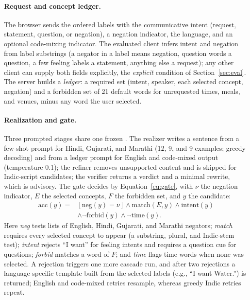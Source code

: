 \paragraph{Request and concept ledger.}
The browser sends the ordered labels with the communicative intent (request, statement, question, or negation), a negation indicator, the language, and an optional code-mixing indicator.
The evaluated client infers intent and negation from label substrings (a negator in a label means negation, question words a question, a few feeling labels a statement, anything else a request); any other client can supply both fields explicitly, the \emph{explicit} condition of Section~\ref{sec:eval}.
The server builds a \emph{ledger}: a required set (intent, speaker, each selected concept, negation) and a forbidden set of 21 default words for unrequested times, meals, and venues, minus any word the user selected.

\paragraph{Realization and gate.}
Three prompted stages share one frozen \qwen{} \citep{qwen2025qwen25}.
The realizer writes a sentence from a few-shot prompt for Hindi, Gujarati, and Marathi (12, 9, and 9 examples; greedy decoding) and from a ledger prompt for English and code-mixed output (temperature 0.1); the refiner removes unsupported content and is skipped for Indic-script candidates; the verifier returns a verdict and a minimal rewrite, which is advisory.
The gate decides by Equation~\eqref{eq:gate}, with $\nu$ the negation indicator, $E$ the selected concepts, $F$ the forbidden set, and $y$ the candidate:
\begin{equation}
\begin{split}
\mathrm{acc}(y)={}&[\mathrm{neg}(y)=\nu]\wedge\mathrm{match}(E,y)\wedge\mathrm{intent}(y)\\
&\wedge\neg\mathrm{forbid}(y)\wedge\neg\mathrm{time}(y).
\end{split}
\label{eq:gate}
\end{equation}
Here \emph{neg} tests lists of English, Hindi, Gujarati, and Marathi negators; \emph{match} requires every selected concept to appear (a substring, plural, and Indic-stem test); \emph{intent} rejects ``I want'' for feeling intents and requires a question cue for questions; \emph{forbid} matches a word of $F$; and \emph{time} flags time words when none was selected.
A rejection triggers one more cascade run, and after two rejections a language-specific template built from the selected labels (e.g., ``I want Water.'') is returned; English and code-mixed retries resample, whereas greedy Indic retries repeat.

